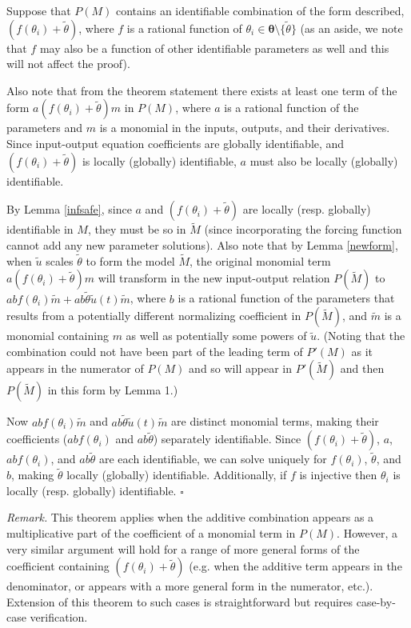 \documentclass[a4paper,fleqn]{cas-dc}
\theoremstyle{definition}
\begin{document}
\begin{pf}
    Suppose that $P(M)$ contains an identifiable combination of the form described, $(f(\theta_i) + \tilde{\theta})$, where $f$ is a rational function of $\theta_i \in \pmb{\theta} \setminus \{\tilde{\theta}\}$ (as an aside, we note that $f$ may also be a function of other identifiable parameters as well and this will not affect the proof). 
    
    Also note that from the theorem statement there exists at least one term of the form $a(f(\theta_i) + \tilde{\theta})m$ in $P(M)$, where $a$ is a rational function of the parameters and $m$ is a monomial in the inputs, outputs, and their derivatives. Since input-output equation coefficients are globally identifiable, and $(f(\theta_i) + \tilde{\theta})$ is locally (globally) identifiable, $a$ must also be locally (globally) identifiable.

    By Lemma \ref{infsafe}, since $a$ and $(f(\theta_i) + \tilde{\theta})$ are locally (resp. globally) identifiable in $M$, they must be so in $\tilde{M}$ (since incorporating the forcing function cannot add any new parameter solutions). Also note that by Lemma \ref{newform}, when $\tilde{u}$ scales $\tilde{\theta}$ to form the model $\tilde{M}$, the original monomial term $a (f(\theta_i) + \tilde{\theta}) m$ will transform in the new input-output relation $P(\tilde{M})$ to $ab f(\theta_i) \tilde{m} + ab\tilde{\theta}\tilde{u}(t) \tilde{m}$, where $b$ is a rational function of the parameters that results from a potentially different normalizing coefficient in $P(\tilde{M})$, and $\tilde{m}$ is a monomial containing $m$ as well as potentially some powers of $\tilde{u}$. (Noting that the combination could not have been part of the leading term of $P'(M)$ as it appears in the numerator of $P(M)$ and so will appear in $P'(\tilde{M})$ and then $P(\tilde{M})$ in this form by Lemma 1.) 
    
    Now $ab f(\theta_i) \tilde{m}$ and $ab\tilde{\theta}\tilde{u}(t) \tilde{m}$ are distinct monomial terms, making their coefficients ($ab f(\theta_i)$ and $ab\tilde{\theta}$) separately identifiable. Since $(f(\theta_i) + \tilde{\theta})$, $a$, $ab f(\theta_i)$, and $ab\tilde{\theta}$ are each identifiable, we can solve uniquely for $f(\theta_i)$, $\tilde{\theta}$, and $b$, making $\tilde{\theta}$ locally (globally) identifiable. Additionally, if $f$ is injective then $\theta_i$ is locally (resp. globally) identifiable.  $\square$ 
\end{pf}


\noindent \textit{Remark.}
This theorem applies when the additive combination appears as a multiplicative part of the coefficient of a monomial term in $P(M)$. 
However, a very similar argument will hold for a range of more general forms of the coefficient containing $(f(\theta_i) + \tilde{\theta})$ (e.g. when the additive term appears in the denominator, or appears with a more general form in the numerator, etc.). 
Extension of this theorem to such cases is straightforward but requires case-by-case verification.
\end{document}
